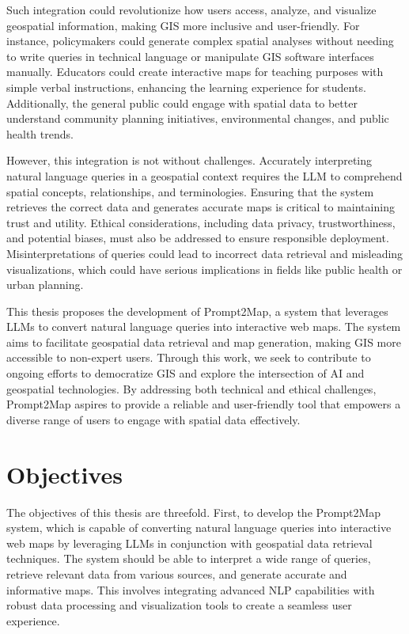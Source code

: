 Such integration could revolutionize how users access, analyze, and visualize geospatial information, making GIS more inclusive and user-friendly. For instance, policymakers could generate complex spatial analyses without needing to write queries in technical language or manipulate GIS software interfaces manually. Educators could create interactive maps for teaching purposes with simple verbal instructions, enhancing the learning experience for students. Additionally, the general public could engage with spatial data to better understand community planning initiatives, environmental changes, and public health trends.

However, this integration is not without challenges. Accurately interpreting natural language queries in a geospatial context requires the LLM to comprehend spatial concepts, relationships, and terminologies. Ensuring that the system retrieves the correct data and generates accurate maps is critical to maintaining trust and utility. Ethical considerations, including data privacy, trustworthiness, and potential biases, must also be addressed to ensure responsible deployment. Misinterpretations of queries could lead to incorrect data retrieval and misleading visualizations, which could have serious implications in fields like public health or urban planning.

This thesis proposes the development of Prompt2Map, a system that leverages LLMs to convert natural language queries into interactive web maps. The system aims to facilitate geospatial data retrieval and map generation, making GIS more accessible to non-expert users. Through this work, we seek to contribute to ongoing efforts to democratize GIS and explore the intersection of AI and geospatial technologies. By addressing both technical and ethical challenges, Prompt2Map aspires to provide a reliable and user-friendly tool that empowers a diverse range of users to engage with spatial data effectively.

\section{Objectives}

The objectives of this thesis are threefold. First, to develop the Prompt2Map system, which is capable of converting natural language queries into interactive web maps by leveraging LLMs in conjunction with geospatial data retrieval techniques. The system should be able to interpret a wide range of queries, retrieve relevant data from various sources, and generate accurate and informative maps. This involves integrating advanced NLP capabilities with robust data processing and visualization tools to create a seamless user experience.

